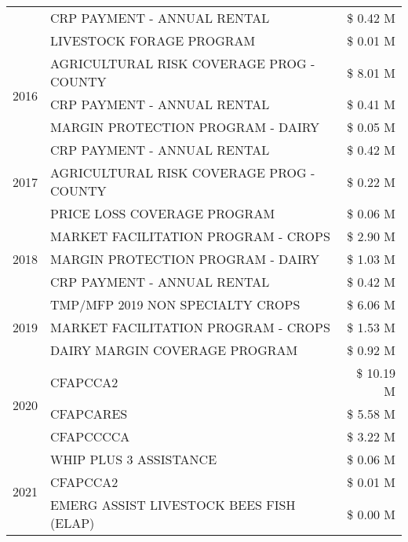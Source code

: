\begin{tabular}{llr}
 & CRP PAYMENT - ANNUAL RENTAL & \$ 0.42 M \\
 & LIVESTOCK FORAGE PROGRAM & \$ 0.01 M \\
\cline{1-3}
\multirow[t]{3}{*}{2016} & AGRICULTURAL RISK COVERAGE PROG - COUNTY & \$ 8.01 M \\
 & CRP PAYMENT - ANNUAL RENTAL & \$ 0.41 M \\
 & MARGIN PROTECTION PROGRAM - DAIRY & \$ 0.05 M \\
\cline{1-3}
\multirow[t]{3}{*}{2017} & CRP PAYMENT - ANNUAL RENTAL & \$ 0.42 M \\
 & AGRICULTURAL RISK COVERAGE PROG - COUNTY & \$ 0.22 M \\
 & PRICE LOSS COVERAGE PROGRAM & \$ 0.06 M \\
\cline{1-3}
\multirow[t]{3}{*}{2018} & MARKET FACILITATION PROGRAM - CROPS & \$ 2.90 M \\
 & MARGIN PROTECTION PROGRAM - DAIRY & \$ 1.03 M \\
 & CRP PAYMENT - ANNUAL RENTAL & \$ 0.42 M \\
\cline{1-3}
\multirow[t]{3}{*}{2019} & TMP/MFP 2019 NON SPECIALTY CROPS & \$ 6.06 M \\
 & MARKET FACILITATION PROGRAM - CROPS & \$ 1.53 M \\
 & DAIRY MARGIN COVERAGE PROGRAM & \$ 0.92 M \\
\cline{1-3}
\multirow[t]{3}{*}{2020} & CFAPCCA2 & \$ 10.19 M \\
 & CFAPCARES & \$ 5.58 M \\
 & CFAPCCCCA & \$ 3.22 M \\
\cline{1-3}
\multirow[t]{3}{*}{2021} & WHIP PLUS 3 ASSISTANCE & \$ 0.06 M \\
 & CFAPCCA2 & \$ 0.01 M \\
 & EMERG ASSIST LIVESTOCK BEES FISH (ELAP) & \$ 0.00 M \\
\cline{1-3}
\bottomrule
\end{tabular}
